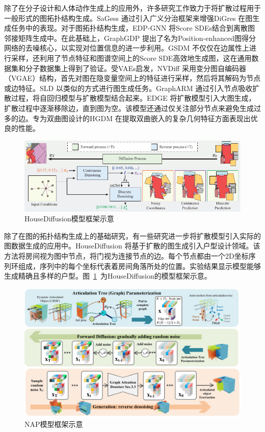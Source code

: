 除了在分子设计和人体动作生成上的应用外，许多研究工作致力于将扩散过程用于一般形式的图拓扑结构生成。SaGess \cite{sagess_limnios_23}通过引入广义分治框架来增强DiGres \cite{digress_vignac_22}在图生成任务中的表现。对于图拓扑结构生成，EDP-GNN \cite{edpgnn_niu_20}将Score SDEs结合到离散图邻接矩阵生成中。在此基础上，GraphGDP \cite{graphgdp_huang_22}提出了名为Position-enhanced图得分网络的去噪核心，以实现对位置信息的进一步利用。GSDM \cite{gsdm_luo_22}不仅仅在边属性上进行采样，还利用了节点特征和图谱空间上的Score SDE高效地生成图，这在通用数据集和分子数据集上得到了验证。受VAEs启发，NVDiff \cite{nvdiff_chen_22}采用变分图自编码器（VGAE）结构，首先对图在隐变量空间上的特征进行采样，然后将其解码为节点或边特征。SLD \cite{sld_yang_23}以类似的方式进行图生成任务。GraphARM \cite{ardiff_kong_23}通过引入节点吸收扩散过程，将自回归模型与扩散模型结合起来。EDGE \cite{edge_chen_23}将扩散模型引入大图生成，扩散过程中逐渐移除边，直到图为空。该模型还通过仅关注部分节点来避免生成过多的边。专为双曲图设计的HGDM \cite{hgdm_wen_23}在提取双曲嵌入的复杂几何特征方面表现出优良的性能。

\begin{figure}[h]
  \centering
  \includegraphics[width=1.0\linewidth]{figures/housediffusion.pdf}
  \caption{HouseDiffusion模型框架示意 \cite{housediffusion_shabani_23}}
  \label{fig:housediffusion}
\end{figure}

除了在图的拓扑结构生成上的基础研究，有一些研究进一步将扩散模型引入实际的图数据生成的应用中。HouseDiffusion \cite{housediffusion_shabani_23}将基于扩散的图生成引入户型设计领域。该方法将房间视为图中节点，将门视为连接节点的边。每个节点都由一个2D坐标序列环组成，序列中的每个坐标代表着房间角落所处的位置。实验结果显示模型能够生成精确且多样的户型。图~\ref{fig:housediffusion}~为HouseDiffusion的模型框架示意。

\begin{figure}[h]
  \centering
  \includegraphics[width=1.0\linewidth]{figures/nap.jpg}
  \caption{NAP模型框架示意 \cite{nap_lei_23}}
  \label{fig:nap}
\end{figure}

